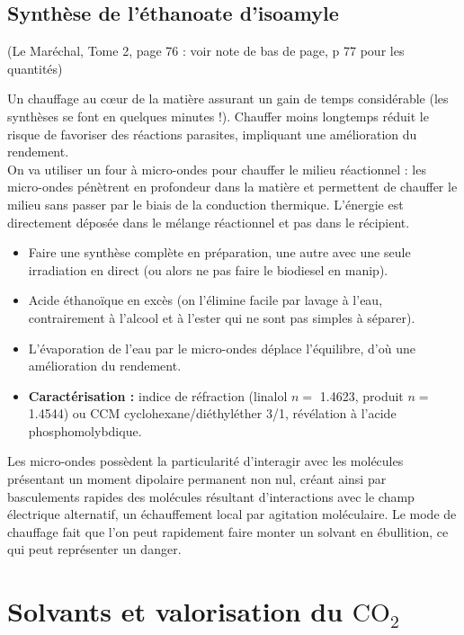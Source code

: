 \documentclass[11pt,a4paper]{report}
\begin{document}
\subsection{Synthèse de l'éthanoate d'isoamyle}
(Le Maréchal, Tome 2, page 76 : voir note de bas de page, p 77 pour les quantités)

Un chauffage au cœur de la matière assurant un gain de temps considérable (les synthèses se font en quelques minutes !). Chauffer moins longtemps réduit le risque de favoriser des réactions parasites, impliquant une amélioration du rendement.\\

On va utiliser un four à micro-ondes pour chauffer le milieu réactionnel : les micro-ondes pénètrent en profondeur dans la matière et permettent de chauffer le milieu sans passer par le biais de la conduction thermique. L'énergie est directement déposée dans le mélange réactionnel et pas dans le récipient.

\begin{itemize}
	\item Faire une synthèse complète en préparation, une autre avec une seule irradiation en direct 		(ou alors ne pas faire le biodiesel en manip).
	\item Acide éthanoïque en excès (on l'élimine facile par lavage à l'eau, contrairement à l'alcool 		et à l'ester qui ne sont pas simples à séparer).
	\item L'évaporation de l'eau par le micro-ondes déplace l'équilibre, d'où une amélioration du 			rendement.\\
	
	\item \textbf{Caractérisation :} indice de réfraction (linalol $n =$ 1.4623, produit $n =$ 1.4544) 		ou CCM cyclohexane/diéthyléther 3/1, révélation à l'acide phosphomolybdique.\\
\end{itemize}

Les micro-ondes possèdent la particularité d'interagir avec les molécules présentant un moment dipolaire permanent non nul, créant ainsi par basculements rapides des molécules résultant d'interactions avec le champ électrique alternatif, un échauffement local par agitation moléculaire. Le mode de chauffage fait que l'on peut rapidement faire monter un solvant en ébullition, ce qui peut représenter un danger. 

\section{Solvants et valorisation du $\text{CO}_2$}
\end{document}

